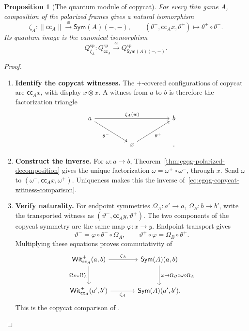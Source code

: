 \documentclass[oneside]{article}
\newcommand{\Sym}{\mathsf{Sym}}
\newcommand{\Wit}{\mathsf{Wit}}
\newcommand{\cc}{\mathsf{cc}}
\theoremstyle{plain}
\newtheorem{proposition}[theorem]{Proposition}
\theoremstyle{definition}
\theoremstyle{remark}
\begin{document}
\begin{proposition}[The quantum module of copycat]
\label{prop:cgqg-copycat-quantum-module}
For every thin game \(A\), composition of the polarized frames gives
a natural isomorphism
\begin{equation}
 \zeta_A:\lVert\cc_A\rVert\xrightarrow{\cong}\Sym(A)(-,-),
 \qquad
 (\theta^-,\cc_Ax,\theta^+)\longmapsto\theta^+\circ\theta^-.
 \label{eq:cgqg-copycat-witness-comparison}
\end{equation}
Its quantum image is the canonical isomorphism
\[
 Q_{\zeta_A}^{\mathrm{sp}}:
 Q_{\cc_A}^{\mathrm{sp}}\xrightarrow{\cong}Q_{\Sym(A)(-,-)}^{\mathrm{sp}}.
\]
\end{proposition}
\begin{proof}
    \leavevmode
    \begin{enumerate}[beginpenalty=10000]
        \item \textbf{Identify the copycat witnesses.}
        The \(+\)-covered configurations of copycat are \(\cc_Ax\),
        with display \(x\otimes x\). A witness from \(a\) to \(b\)
        is therefore the factorization triangle
        \[
        \begin{tikzcd}[column sep=huge,row sep=large]
        a\arrow[rr,"\zeta_A(w)"]\arrow[dr,"\theta^-"']
          &&b\\
          &x\arrow[ur,"\theta^+"']&.
        \end{tikzcd}
        \]

        \item \textbf{Construct the inverse.}
        For \(\omega:a\to b\), Theorem~\ref{thm:cgqg-polarized-decomposition}
        gives the unique factorization \(\omega=\omega^+\circ\omega^-\),
        through \(x\). Send \(\omega\) to
        \((\omega^-,\cc_Ax,\omega^+)\). Uniqueness makes this the
        inverse of~\eqref{eq:cgqg-copycat-witness-comparison}.

        \item \textbf{Verify naturality.}
        For endpoint symmetries \(\Omega_A:a'\to a\), \(\Omega_B:b\to b'\),
        write the transported witness as
        \((\vartheta^-,\cc_Ay,\vartheta^+)\).
        The two components of the copycat symmetry are the same
        map \(\varphi:x\to y\). Endpoint transport gives
        \[
        \vartheta^-=\varphi\circ\theta^-\circ\Omega_A,\qquad
        \vartheta^+\circ\varphi=\Omega_B\circ\theta^+.
        \]
        Multiplying these equations proves commutativity of
        \[
        \begin{tikzcd}[column sep=large,row sep=large]
        \Wit_{\cc_A}^+(a,b)\arrow[r,"\zeta_A"]
          \arrow[d,"\Omega_{B*}\Omega_A^*"']
          &\Sym(A)(a,b)\arrow[d,"{\omega\mapsto\Omega_B\circ\omega\circ\Omega_A}"]\\
        \Wit_{\cc_A}^+(a',b')\arrow[r,"\zeta_A"']&\Sym(A)(a',b').
        \end{tikzcd}
        \]
        This is the copycat comparison of
        \cite[Proposition~5.12]{ClairambaultOlimpieriPaquet2025}.


\end{enumerate}
\end{proof}
\end{document}
